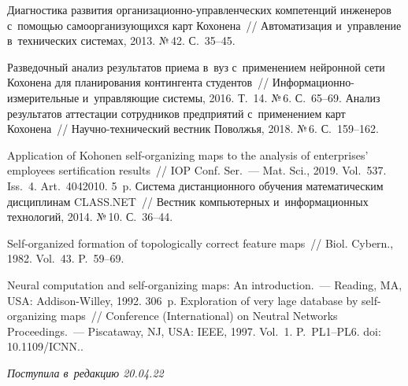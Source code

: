 \begin{multicols}{2}
{{\begin{thebibliography}{99}
 Диагностика развития  
ор\-га\-ни\-за\-ци\-он\-но-управ\-лен\-че\-ских компетенций инженеров с~помощью 
самоорганизующихся карт Кохонена~// Автоматизация и~управление в~технических 
системах, 2013. №\,42. С.~35--45.

 Разведочный анализ результатов 
приема в~вуз с~применением нейронной сети Кохонена для планирования контингента 
студентов~// Ин\-фор\-ма\-ци\-он\-но-из\-ме\-ри\-тель\-ные и~управ\-ля\-ющие сис\-те\-мы, 
2016. Т.~14. №\,6. С.~65--69.
Анализ результатов аттестации сотрудников предприятий 
с~применением карт Кохонена~// На\-уч\-но-тех\-ни\-че\-ский вестник Поволжья, 2018. 
№\,6. С.~159--162.

 Application of Kohonen self-organizing maps to the analysis 
of enterprises' employees sertification results~// IOP Conf. Ser.~--- Mat. Sci., 2019. Vol.~537. Iss.~4. Art.~4042010. 5~p.
 Сис\-те\-ма дистанционного 
обучения математическим дисциплинам CLASS.NET~// Вестник компьютерных 
и~информационных технологий, 2014. №\,10. С.~36--44.

 Self-organized formation of topologically correct feature maps~// Biol. 
Cybern., 1982. Vol.~43. P.~59--69.

 Neural computation and self-organizing maps: An 
introduction.~--- Reading, MA, USA: Addison-Willey, 1992. 306~p.
 Exploration of very lage database by self-organizing maps~//  Conference 
(International) on Neutral Networks Proceedings.~--- Piscataway, NJ, USA: IEEE, 1997. Vol.~1. 
P.~PL1--PL6. doi: 10.1109/ICNN..

\end{thebibliography}

 }
 }

\end{multicols}

\vspace*{-6pt}

\hfill{\small\textit{Поступила в~редакцию 20.04.22}}

